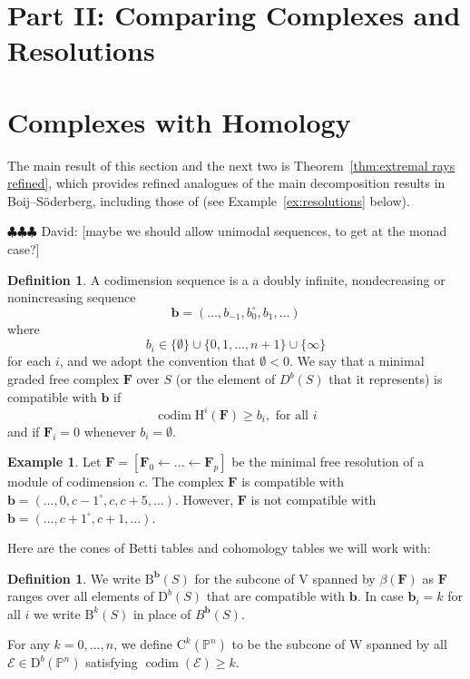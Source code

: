 \documentclass[12pt]{amsart}
\theoremstyle{definition}
\newtheorem{example}[lemma]{Example}
\newtheorem{defn}[lemma]{Definition}
\theoremstyle{remark}
\newcommand{\codim}{\operatorname{codim}}
\newcommand{\PP}{\mathbb{P}}
\newcommand{\HH}{\mathrm{H}}
\newcommand{\VV}{\mathrm{V}}
\newcommand{\WW}{\mathrm{W}}
\newcommand{\bb}{\mathbf{b}}
\newcommand{\cE}{\mathcal{E}}
\newcommand{\FF}{\mathbf{F}}
\newcommand{\defi}[1]{\textsf{#1}} %
\newcommand{\DD}{\mathrm{D}}
\newcommand{\CQ}{\mathrm{C}}
\newcommand{\BBQ}{\mathrm{B}}
\newcommand{\david}[1]{{\color{red} \sf $\clubsuit\clubsuit\clubsuit$ David: [#1]}}
\begin{document}
\section*{Part II: Comparing Complexes and Resolutions}
\section{Complexes with Homology}\label{sec:refined}
The main result of this section and the next two is Theorem~\ref{thm:extremal rays refined}, which provides refined analogues of the main decomposition results in Boij--S\"oderberg, including those of \cites{eis-schrey1,boij-sod2} (see Example~\ref{ex:resolutions} below).  

\david{maybe we should allow unimodal sequences, to get at the monad case?}
\begin{defn} A \defi{codimension sequence} is a
a doubly infinite, nondecreasing or nonincreasing sequence 
$$
\bb=(\dots, b_{-1}, b_{0}^{\circ}, b_{1}, \dots )
$$
where  
$$
b_{i}\in \{\emptyset\} \cup \{0,1,\dots,n+1\}\cup \{\infty\}
$$
for each $i$, and we adopt the convention that $\emptyset<0$.   We say that a
minimal graded free complex $\FF$ over $S$ (or the element of $D^{b}(S)$ that it represents) is \defi{compatible with $\bb$} if 
\[
\codim \HH^i(\FF) \geq b_i, \text{ for all } i
\]
and if $\FF_i=0$ whenever $b_i=\emptyset$.
\end{defn}

\begin{example}
Let $\FF=[\FF_0\gets \dots \gets \FF_p]$ be the minimal free resolution of a module of codimension $c$.  The complex $\FF$ is compatible with $\bb=(\dots, 0,c-1^\circ,c,c+5,\dots)$.  However, $\FF$ is not compatible with $\bb=(\dots,c+1^\circ,c+1,\dots)$.  
\end{example}

Here are the cones of Betti tables and cohomology tables we will work with:
\begin{defn}\label{defn:cones}
We write $\BBQ^{\bb}(S)$ for the subcone of $\VV$ spanned by $\beta(\FF)$ as $\FF$ ranges over all elements of $\DD^b(S)$ that are compatible with $\bb$.  In case  $\bb_i=k$ for all $i$ we write $\BBQ^k(S)$ in place of $B^{\bb}(S)$.

For any $k=0, \dots, n$, we define $\CQ^k(\PP^n)$ to be the subcone of $\WW$ spanned by all $\cE\in \DD^b(\PP^n)$ satisfying $\codim(\cE)\geq k$.
\end{defn}
\end{document}
